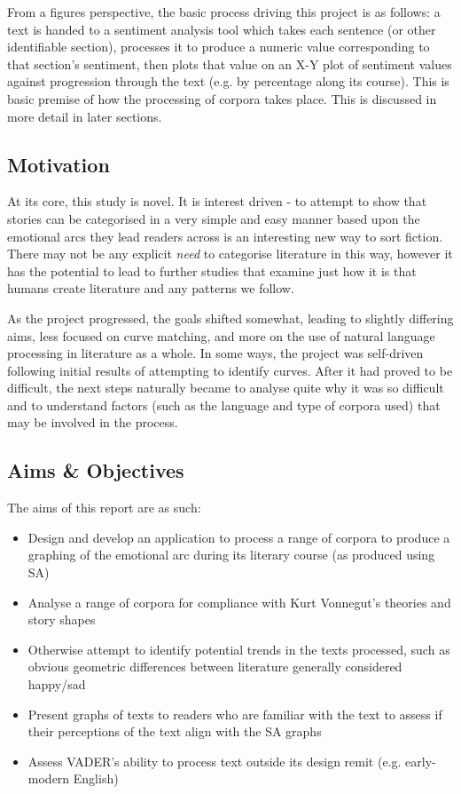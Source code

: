 \documentclass{article}
\begin{document}
{        From a figures perspective, the basic process driving this project is as follows: a text is handed to a sentiment analysis tool which takes each sentence (or other identifiable section), processes it to produce a numeric value corresponding to that section's sentiment, then plots that value on an X-Y plot of sentiment values against progression through the text (e.g. by percentage along its course). This is basic premise of how the processing of corpora takes place. This is discussed in more detail in later sections.
    \subsection{Motivation}
        At its core, this study is novel. It is interest driven - to attempt to show that stories can be categorised in a very simple and easy manner based upon the emotional arcs they lead readers across is an interesting new way to sort fiction. There may not be any explicit \textit{need} to categorise literature in this way, however it has the potential to lead to further studies that examine just how it is that humans create literature and any patterns we follow.

        As the project progressed, the goals shifted somewhat, leading to slightly differing aims, less focused on curve matching, and more on the use of natural language processing in literature as a whole. In some ways, the project was self-driven following initial results of attempting to identify curves. After it had proved to be difficult, the next steps naturally became to analyse quite why it was so difficult and to understand factors (such as the language and type of corpora used) that may be involved in the process.
    \subsection{Aims \& Objectives}
        The aims of this report are as such:
        \begin{itemize}
            \item Design and develop an application to process a range of corpora to produce a graphing of the emotional arc during its literary course (as produced using SA)
            \item Analyse a range of corpora for compliance with Kurt Vonnegut’s theories and story shapes
            \item Otherwise attempt to identify potential trends in the texts processed, such as obvious geometric differences between literature generally considered happy/sad
            \item Present graphs of texts to readers who are familiar with the text to assess if their perceptions of the text align with the SA graphs
            \item Assess VADER's ability to process text outside its design remit (e.g. early-modern English)
        \end{itemize}
}
\end{document}
